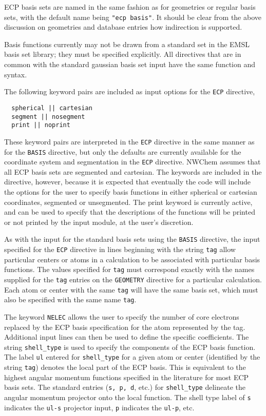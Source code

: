 ECP basis sets are named in the same fashion as for geometries 
or regular basis sets,
with the default name being \verb+"ecp basis"+.  It
should be clear from the above discussion on geometries and database
entries how indirection is supported.

Basis functions currently may not be drawn from a standard set in the
EMSL basis set library; they must be specified explicitly.  All
directives that are in common with the standard gaussian basis set
input have the same function and syntax.

The following keyword pairs are included as input options for the 
\verb+ECP+ directive,

\begin{verbatim}
  spherical || cartesian
  segment || nosegment
  print || noprint
\end{verbatim}

These keyword pairs are interpreted in the \verb+ECP+ 
directive in the same manner as for
the \verb+BASIS+ directive, but only the defaults are currently
available for the coordinate system and segmentation in the \verb+ECP+
directive.  NWChem assumes that all ECP basis sets are segmented and
cartesian.  The keywords are included in the directive, however,
because it is expected that eventually the code will include the
options for the user to specify basis functions in either spherical or
cartesian coordinates, segmented or unsegmented.  The print keyword is
currently active, and can be used to specify that the descriptions of
the functions will be printed or not printed by the input module, at
the user's discretion.

As with the input for the standard basis sets using the \verb+BASIS+
directive, the input specified for the \verb+ECP+ directive in lines 
beginning with the string \verb+tag+
allow particular centers or atoms in a calculation to be associated with
particular basis functions.  The values specified for \verb+tag+
must correspond exactly with the names supplied for the \verb+tag+ entries
on the \verb+GEOMETRY+ directive for a particular calculation.  Each atom
or center with the same \verb+tag+ will have the same basis set, which must
also be specified with the same name \verb+tag+.

The keyword \verb+NELEC+ allows the user to specify the number of core 
electrons replaced by
the ECP basis specification for the atom represented by the tag.  Additional
input lines can then be used to define the specific coefficients.
The string \verb+shell_type+ is used to specify the components of the
ECP basis function.  The label \verb+ul+ entered for \verb+shell_type+
for a given atom or center (identified by the string \verb+tag+) denotes
the local part of the ECP basis.  This is equivalent to the highest 
angular momentum
functions specified in the literature for most ECP basis sets.  The
standard entries (\verb+s, p, d+, etc.) for \verb+shell_type+ delineate 
the angular momentum projector onto the local function.  The shell type 
label of \verb+s+ indicates the \verb+ul-s+ projector input, \verb+p+ 
indicates the \verb+ul-p+, etc.

